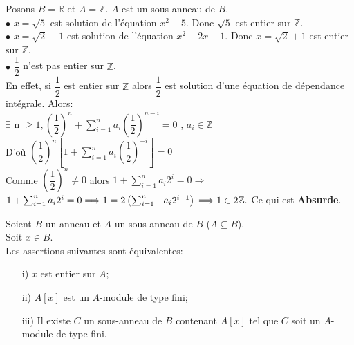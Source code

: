 \begin{monexemple}
	Posons $B = \mathbb{R}$ et $A = \mathbb{Z}$. $A$ est un sous-anneau de $B$.\\
	$\bullet$ $x = \sqrt{5}$ est solution de l'équation $x^2 - 5$. Donc $\sqrt{5}$ est entier sur $\mathbb{Z}$.\\
	$\bullet$ $x = \sqrt{2}+1$ est solution de l'équation $x^2 - 2x -1$. Donc $x = \sqrt{2}+1$ est entier sur $\mathbb{Z}$.\\
	$\bullet$ $\dfrac{1}{2}$ n'est pas entier sur $\mathbb{Z}$.\\
	En effet, si $\dfrac{1}{2}$ est entier sur $\mathbb{Z}$ alors $\dfrac{1}{2}$ est solution d'une équation de dépendance intégrale. Alors: \\
	$\exists$ n $\geq 1 , \left(\dfrac{1}{2} \right)^n + \sum_{i=1}^{n} a_i \left(\dfrac{1}{2} \right)^{n-i} = 0$ , $a_i \in\mathbb{Z}$\\
	D'où $\left(\dfrac{1}{2} \right)^n \left[1+\sum_{i=1}^{n} a_i \left(\dfrac{1}{2} \right)^{-i}\right] = 0$\\
	Comme $\left(\dfrac{1}{2} \right)^n \neq 0$ alors $1+\sum_{i=1}^{n} a_i2^{i} = 0\Longrightarrow$ $1+\sum_{i=1}^{n} a_i2^{i} = 0 \Longrightarrow 1 = 2\left(\sum_{i=1}^{n} -a_i 2^{i-1}\right)\\ \Longrightarrow 1\in 2\mathbb{Z}.$ Ce qui est \textbf{Absurde}. 
\end{monexemple}
\begin{maproposition}
	Soient $B$ un anneau et $A$ un sous-anneau de $B$ ($A \subseteq B$).\\
	Soit $x \in B$. \\
	Les assertions suivantes sont équivalentes:\\
	\begin{enumerate}
		\item[i)]$x$ est entier sur $A$;\\
		\item[ii)]$A\left[ x\right]$ est un $A$-module de type fini;\\
		\item[iii)]Il existe $C$ un sous-anneau de $B$ contenant $A\left[ x\right]$ tel que $C$ soit un $A$-module de type fini.
	\end{enumerate}
\end{maproposition}
